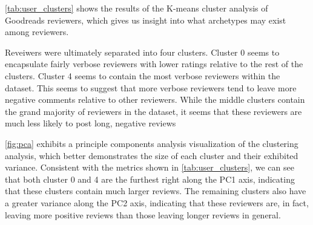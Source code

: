 \autoref{tab:user_clusters} shows the results of the K-means cluster analysis of Goodreads reviewers, which gives us insight into what archetypes may exist among reviewers.

Reveiwers were ultimately separated into four clusters. Cluster 0 seems to encapsulate fairly verbose reviewers with lower ratings relative to the rest of the clusters. Cluster 4 seems to contain the most verbose reviewers within the dataset. This
seems to suggest that more verbose reviewers tend to leave more negative comments relative to other reviewers. While the middle clusters contain the grand majority of reviewers in the dataset, it seems that these reviewers are much less likely to post long, negative reviews

\autoref{fig:pca} exhibits a principle components analysis visualization of the clustering analysis, which better demonstrates the size of each cluster and their exhibited variance. Consistent with the metrics shown in \autoref{tab:user_clusters},
we can see that both cluster 0 and 4 are the furthest right along the PC1
axis, indicating that these clusters contain much larger reviews. The remaining clusters
also have a greater variance along the PC2 axis, indicating that these reviewers are, in fact, leaving more positive reviews than those leaving longer reviews in general.
